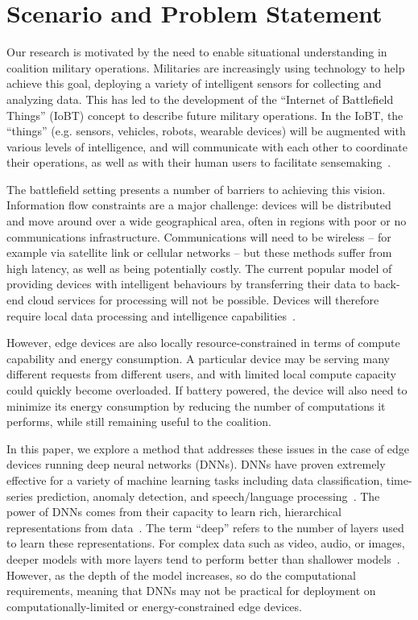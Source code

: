 \section{Scenario and Problem Statement}
\label{sec:scenario}
Our research is motivated by the need to enable situational understanding in coalition military operations. Militaries are increasingly using technology to help achieve this goal, deploying a variety of intelligent sensors for collecting and analyzing data. This has led to the development of the “Internet of Battlefield Things” (IoBT) concept to describe future military operations. In the IoBT, the “things” (e.g. sensors, vehicles, robots, wearable devices) will be augmented with various levels of intelligence, and will communicate with each other to coordinate their operations, as well as with their human users to facilitate sensemaking~\cite{Kott:2016, Suri:2016}.

The battlefield setting presents a number of barriers to achieving this vision. Information flow constraints are a major challenge: devices will be distributed and move around over a wide geographical area, often in regions with poor or no communications infrastructure. Communications will need to be wireless -- for example via satellite link or cellular networks -- but these methods suffer from high latency, as well as being potentially costly. The current popular model of providing devices with intelligent behaviours by transferring their data to back-end cloud services for processing will not be possible. Devices will therefore require local data processing and intelligence capabilities~\cite{Verma:2017}.

However, edge devices are also locally resource-constrained in terms of compute capability and energy consumption. A particular device may be serving many different requests from different users, and with limited local compute capacity could quickly become overloaded. If battery powered, the device will also need to minimize its energy consumption by reducing the number of computations it performs, while still remaining useful to the coalition.

In this paper, we explore a method that addresses these issues in the case of edge devices running deep neural networks (DNNs). DNNs have proven extremely effective for a variety of machine learning tasks including data classification, time-series prediction, anomaly detection, and speech/language processing~\cite{LeCun:2015, Goodfellow:2016}. The power of DNNs comes from their capacity to learn rich, hierarchical representations from data~\cite{Bengio:2013}. The term “deep” refers to the number of layers used to learn these representations. For complex data such as video, audio, or images, deeper models with more layers tend to perform better than shallower models~\cite{Szegedy:2015}. However, as the depth of the model increases, so do the computational requirements, meaning that DNNs may not be practical for deployment on computationally-limited or energy-constrained edge devices.

